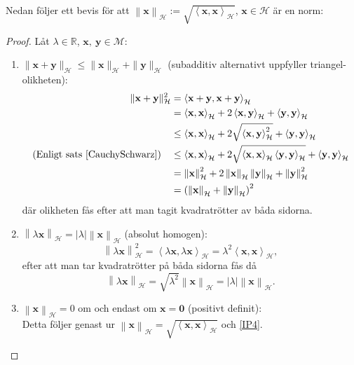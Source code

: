 \documentclass[a4paper, 12pt]{report}
\theoremstyle{definition}
\theoremstyle{remark}
\newcommand{\bfx}{\mathbf{x}}
\newcommand{\llangle}{\left\langle}
\newcommand{\rrangle}{\right\rangle}
\begin{document}
Nedan följer ett bevis för att $\left\| \bfx \right\|_\mathcal{H} := \sqrt{\llangle \bfx , \bfx \rrangle_\mathcal{H}}$, $\bfx \in\mathcal{H}$ är en norm:
\begin{proof}
	Låt $\lambda \in \mathbb{R}$, $\bfx,~\mathbf{y}\in \mathcal{M}$:
	\begin{enumerate}[label=\textbf{N\arabic*}]
		\item $\| \bfx + \mathbf{y}\|_\mathcal{H} \leq \| \bfx \|_\mathcal{H} + \| \mathbf{y}\|_\mathcal{H}$ (subadditiv alternativt uppfyller triangel-olikheten): 
		\begin{align*}
			\| \bfx + \mathbf{y}\|_\mathcal{H}^2 &= \llangle \bfx + \mathbf{y}, \bfx + \mathbf{y}\rrangle_\mathcal{H}\\
			&= \llangle \bfx, \bfx \rrangle_\mathcal{H} + 2 \llangle \bfx, \mathbf{y}\rrangle_\mathcal{H} + \llangle \mathbf{y}, \mathbf{y} \rrangle_\mathcal{H}\\
			&\leq \llangle \bfx, \bfx \rrangle_\mathcal{H} + 2\sqrt{\llangle \bfx, \mathbf{y}\rrangle^2_\mathcal{H}} + \llangle \mathbf{y}, \mathbf{y} \rrangle_\mathcal{H}\\
			\text{(Enligt sats \ref{CauchySchwarz})}\quad&\leq \llangle \bfx, \bfx \rrangle_\mathcal{H} + 2\sqrt{\llangle \bfx, \bfx\rrangle_ \mathcal{H} \llangle \mathbf{y}, \mathbf{y} \rrangle_\mathcal{H}} + \llangle \mathbf{y}, \mathbf{y} \rrangle_\mathcal{H}\\
			&=\left\|\bfx \right\|^2_\mathcal{H} + 2\left\|\bfx \right\|_\mathcal{H}\left\|\mathbf{y} \right\|_\mathcal{H}  + \left\| \mathbf{y}\right\|^2_\mathcal{H}\\
			&= \left(\left\|\bfx \right\|_\mathcal{H}+ \left\| \mathbf{y}\right\|_\mathcal{H}\right)^2
		\end{align*}
		där olikheten fås efter att man tagit kvadratrötter av båda sidorna.
		\item $\left\| \lambda\bfx \right\|_\mathcal{H} = \left|\lambda\right|\left\| \bfx \right\|_\mathcal{H}$ (absolut homogen):
		\begin{equation}
			\left\| \lambda\bfx \right\|_\mathcal{H}^2 = \llangle \lambda \bfx, \lambda \bfx \rrangle_\mathcal{H}
			= \lambda^2 \llangle \bfx, \bfx \rrangle_\mathcal{H},
		\end{equation}
		efter att man tar kvadratrötter på båda sidorna fås då
		\begin{equation*}
			\left\| \lambda\bfx \right\|_\mathcal{H} = \sqrt{\lambda^2}\left\| \bfx \right\|_\mathcal{H} = \left|\lambda\right| \left\| \bfx \right\|_\mathcal{H}.
		\end{equation*}
		\item $\left\| \bfx \right\|_\mathcal{H}=0$ om och endast om $\bfx = \mathbf{0}$ (positivt definit):\\
		Detta följer genast ur $\left\| \bfx \right\|_\mathcal{H} = \sqrt{\llangle \bfx, \bfx \rrangle_\mathcal{H}}$ och \ref{IP4}. \qedhere
	\end{enumerate}
\end{proof}
\end{document}
